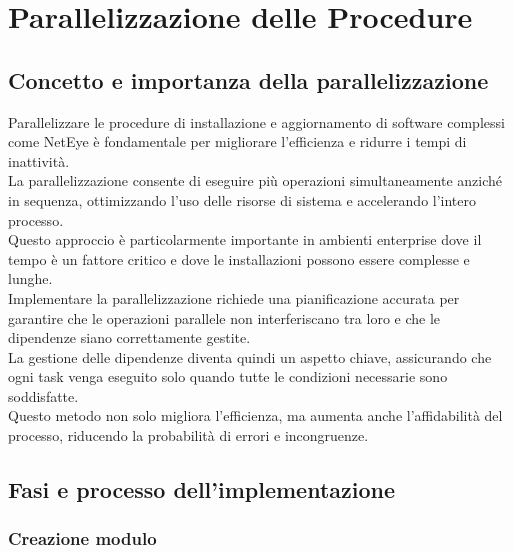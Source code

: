 \chapter{Parallelizzazione delle Procedure}
\label{cha:parallelizzazione}

\section{Concetto e importanza della parallelizzazione}
\label{sec:introduzione_parallelizzazione}

Parallelizzare le procedure di installazione e aggiornamento di software complessi
come NetEye è fondamentale per migliorare l'efficienza e ridurre i tempi di inattività.\\
La parallelizzazione consente di eseguire più operazioni simultaneamente anziché
in sequenza, ottimizzando l'uso delle risorse di sistema e accelerando l'intero
processo.\\ Questo approccio è particolarmente importante in ambienti enterprise
dove il tempo è un fattore critico e dove le installazioni possono essere
complesse e lunghe.\\ Implementare la parallelizzazione richiede una
pianificazione accurata per garantire che le operazioni parallele non
interferiscano tra loro e che le dipendenze siano correttamente gestite.\\ La
gestione delle dipendenze diventa quindi un aspetto chiave, assicurando che ogni
task venga eseguito solo quando tutte le condizioni necessarie sono soddisfatte.\\
Questo metodo non solo migliora l'efficienza, ma aumenta anche l'affidabilità
del processo, riducendo la probabilità di errori e incongruenze.

\section{Fasi e processo dell'implementazione}
\label{sec:fasi_parallelizzazione}

\subsection{Creazione modulo}
\label{sub:modulo_parallelizzazione}

